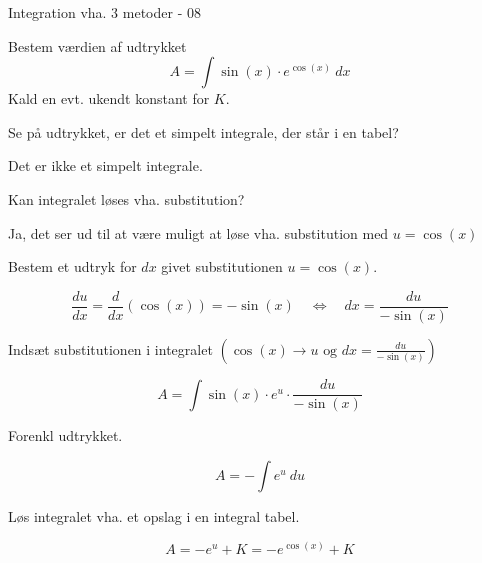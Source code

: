 \documentclass{article}
\begin{document}
\begin{exercise}{Integration vha. 3 metoder - 08}

Bestem værdien af udtrykket
\[
A = \int \sin(x) \cdot e^{\cos(x)} \ dx
\]
Kald en evt. ukendt konstant for $K$.


\hint
Se på udtrykket, er det et simpelt integrale, der står i en tabel?

\hint
Det er ikke et simpelt integrale.

\hint
Kan integralet løses vha. substitution?

\hint
Ja, det ser ud til at være muligt at løse vha. substitution med $u=\cos(x)$

\hint
Bestem et udtryk for $dx$ givet substitutionen $u=\cos(x)$.

\hint
\[
\frac{du}{dx} = \frac{d}{dx} \left(\cos(x) \right) = - \sin(x) \quad \Leftrightarrow \quad dx = \frac{du}{ - \sin(x)}
\]

\hint
Indsæt substitutionen i integralet $\left(\cos(x) \rightarrow u \textrm{ og } dx = \frac{du}{ - \sin(x)} \right)$

\hint
\[
A = \int \sin(x) \cdot e^{u} \cdot \frac{du}{ - \sin(x)}
\]

\hint
Forenkl udtrykket.

\hint
\[
A= - \int e^{u} \ du
\]

\hint
Løs integralet vha. et opslag i en integral tabel.

\hint
\[
A = - e^{u} + K = -e^{\cos(x)} + K
\]


\end{exercise}
\end{document}
